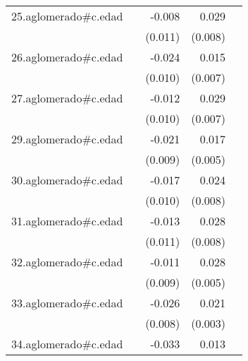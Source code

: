 {\begin{longtable}{l*{4}{D{.}{.}{-1}}}
\addlinespace
25.aglomerado#c.edad&                     &      -0.008         &       0.029\sym{***}&                     \\
            &                     &     (0.011)         &     (0.008)         &                     \\
\addlinespace
26.aglomerado#c.edad&                     &      -0.024\sym{*}  &       0.015\sym{*}  &                     \\
            &                     &     (0.010)         &     (0.007)         &                     \\
\addlinespace
27.aglomerado#c.edad&                     &      -0.012         &       0.029\sym{***}&                     \\
            &                     &     (0.010)         &     (0.007)         &                     \\
\addlinespace
29.aglomerado#c.edad&                     &      -0.021\sym{*}  &       0.017\sym{**} &                     \\
            &                     &     (0.009)         &     (0.005)         &                     \\
\addlinespace
30.aglomerado#c.edad&                     &      -0.017         &       0.024\sym{**} &                     \\
            &                     &     (0.010)         &     (0.008)         &                     \\
\addlinespace
31.aglomerado#c.edad&                     &      -0.013         &       0.028\sym{***}&                     \\
            &                     &     (0.011)         &     (0.008)         &                     \\
\addlinespace
32.aglomerado#c.edad&                     &      -0.011         &       0.028\sym{***}&                     \\
            &                     &     (0.009)         &     (0.005)         &                     \\
\addlinespace
33.aglomerado#c.edad&                     &      -0.026\sym{***}&       0.021\sym{***}&                     \\
            &                     &     (0.008)         &     (0.003)         &                     \\
\addlinespace
34.aglomerado#c.edad&                     &      -0.033\sym{***}&       0.013\sym{*}  &                     \\

\end{longtable}}
